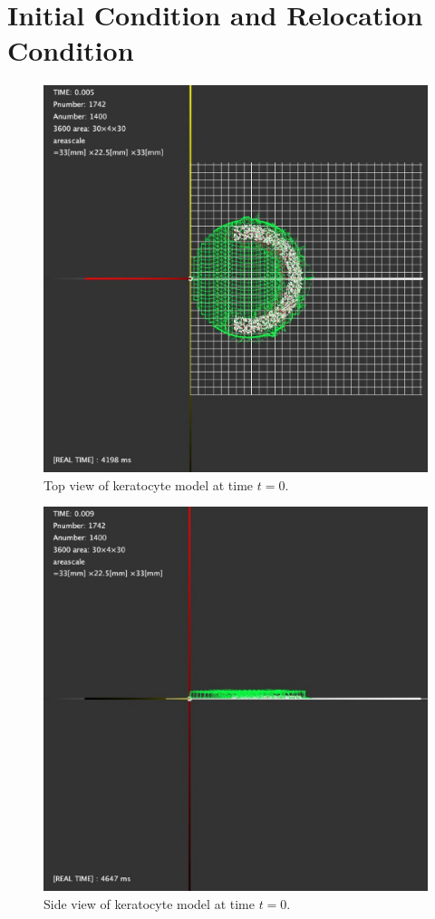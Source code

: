 \documentclass[a4paper,12pt, oneside]{book}
\begin{document}
\section{Initial Condition and Relocation  Condition}
\begin{figure}[tbp]
\centering
\includegraphics[scale=0.25]{top.eps}
\caption{Top view of keratocyte model at time $t=0$.}
\label{fig:top0}
\end{figure}
\begin{figure}[tbp]
\centering
\includegraphics[scale=0.25]{side.eps}
\caption{Side view of keratocyte model at time $t=0$.}
\label{fig:side0}
\end{figure}
\end{document}
